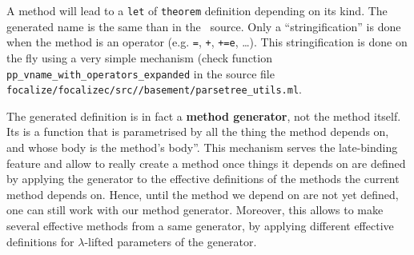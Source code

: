 A method will lead to a {\tt let} of {\tt theorem} definition
depending on its kind. The generated name is the same than in the
\focalize\ source. Only a ``stringification'' is done when the method
is an operator (e.g. {\tt =}, {\tt +}, {\tt +=e}, \ldots). This
stringification is done on the fly using a very simple mechanism
(check function \\
{\tt pp\_vname\_with\_operators\_expanded} in the source
file \\
{\tt focalize/focalizec/src//basement/parsetree\_utils.ml}.

The generated definition is in fact a {\bf method generator}, not the
method itself. Its is a function that is parametrised by all the thing
the method depends on, and whose body is the method's body''. This
mechanism serves the late-binding feature and allow to really create a
method once things it depends on are defined by applying the generator
to the effective definitions of the methods the current method depends
on. Hence, until the method we depend on are not yet defined, one can
still work with our method generator. Moreover, this allows to make
several effective methods from a same generator, by applying
different effective definitions for $\lambda$-lifted  parameters of
the generator.

